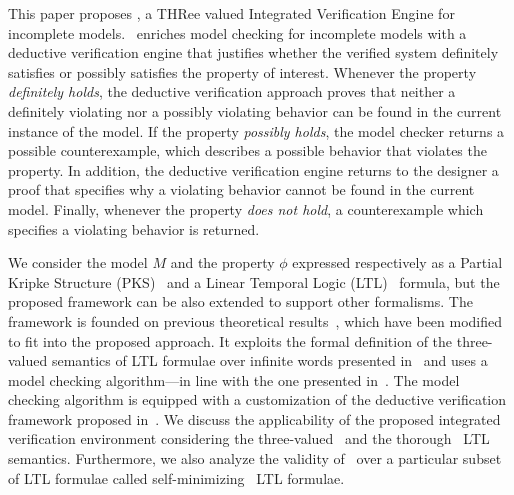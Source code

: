 This paper proposes \NAME , a THRee valued Integrated Verification Engine for incomplete models.
\NAME\ enriches model checking for incomplete models with a deductive verification engine that justifies whether the verified system definitely satisfies or possibly satisfies the property of interest.
Whenever the property \emph{definitely holds}, the deductive verification approach proves that neither a definitely violating nor a possibly violating behavior can be found in the current instance of the model.
If the property \emph{possibly holds}, the model checker returns a possible counterexample, which describes a possible behavior that violates the property. 
In addition, the deductive verification engine returns to the designer a proof that specifies why a violating behavior cannot be found in the current model.
Finally, whenever the property \emph{does not hold}, a counterexample which specifies a violating behavior is returned.

We consider the model $M$ and the property $\phi$ expressed respectively as a Partial Kripke Structure (PKS)~\cite{bruns1999model} and a Linear Temporal Logic (LTL)~\cite{pnueli1977temporal} formula, but the proposed framework can be also extended to support other formalisms.
The framework is founded on previous theoretical results~\cite{bruns2000model,godefroid2005MCvsGMC,godefroid2011ltl,peled2001model}, which have been modified to fit into the proposed approach. It exploits the formal definition of the three-valued semantics of LTL formulae over infinite words presented in~\cite{godefroid2011ltl} and uses a model checking algorithm---in line with the one presented in~\cite{bruns2000model,gurfinkel2003multi}.
The model checking algorithm is equipped with a customization of the deductive verification framework proposed in~\cite{peled2001model}.
We discuss the applicability of the proposed integrated verification environment considering the three-valued~\cite{bruns1999model} and the thorough~\cite{bruns2000model} LTL semantics.
Furthermore, we also analyze the validity of \NAME\ over a particular subset of LTL formulae called self-minimizing~\cite{godefroid2005MCvsGMC} LTL formulae.



